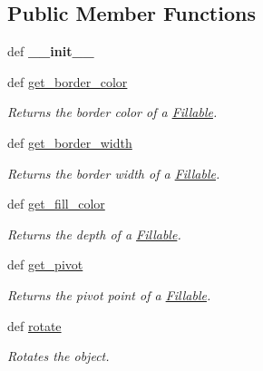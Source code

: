 \subsection*{Public Member Functions}
\begin{DoxyCompactItemize}
\item 
\hypertarget{classcs110graphics_1_1Fillable_a91e490828e9b9f0c3545af7fabf7a0b0}{
def {\bfseries \_\-\_\-init\_\-\_\-}}
\label{classcs110graphics_1_1Fillable_a91e490828e9b9f0c3545af7fabf7a0b0}

\item 
def \hyperlink{classcs110graphics_1_1Fillable_a6772d56158c9fe98a33f01d47cb8aa41}{get\_\-border\_\-color}
\begin{DoxyCompactList}\small\item\em Returns the border color of a \hyperlink{classcs110graphics_1_1Fillable}{Fillable}. \item\end{DoxyCompactList}\item 
def \hyperlink{classcs110graphics_1_1Fillable_a6ed7a4288e84a090ec185c8bdff21d0f}{get\_\-border\_\-width}
\begin{DoxyCompactList}\small\item\em Returns the border width of a \hyperlink{classcs110graphics_1_1Fillable}{Fillable}. \item\end{DoxyCompactList}\item 
def \hyperlink{classcs110graphics_1_1Fillable_a16c045bc9b63961b696914ee1a1d14d9}{get\_\-fill\_\-color}
\begin{DoxyCompactList}\small\item\em Returns the depth of a \hyperlink{classcs110graphics_1_1Fillable}{Fillable}. \item\end{DoxyCompactList}\item 
def \hyperlink{classcs110graphics_1_1Fillable_a514fa0d21297c1372681afae9219fd58}{get\_\-pivot}
\begin{DoxyCompactList}\small\item\em Returns the pivot point of a \hyperlink{classcs110graphics_1_1Fillable}{Fillable}. \item\end{DoxyCompactList}\item 
def \hyperlink{classcs110graphics_1_1Fillable_afa6710f6c314de39d19f06d9dd306d7d}{rotate}
\begin{DoxyCompactList}\small\item\em Rotates the object. \item\end{DoxyCompactList}\item 

\end{DoxyCompactItemize}
